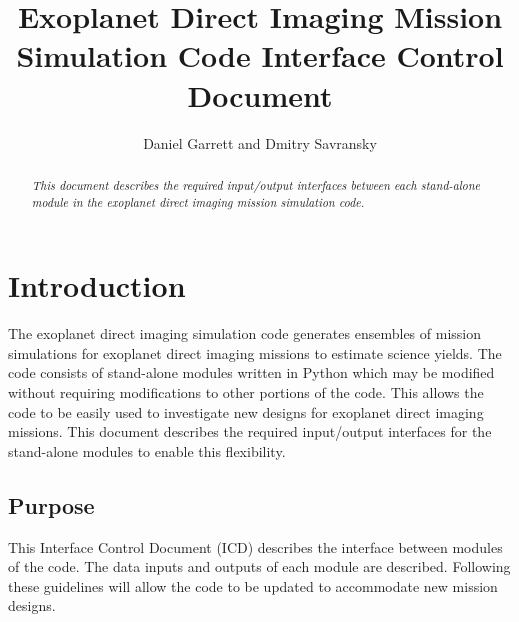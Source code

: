 \documentclass[]{asme2ej}
\title{Exoplanet Direct Imaging Mission Simulation Code Interface Control Document}
\author{Daniel Garrett and Dmitry Savransky
    \affiliation{
	Sibley School of Mechanical and Aerospace Egnineering\\
	Cornell University\\
	Ithaca, NY 14853\\
    }	
}
\begin{document}
\maketitle    

\begin{abstract}
{\it 
This document describes the required input/output interfaces between each stand-alone module in the exoplanet direct imaging mission simulation code.
}
\end{abstract}

\tableofcontents

\begin{nomenclature}
\end{nomenclature}


\section{Introduction}

The exoplanet direct imaging simulation code generates ensembles of mission simulations for exoplanet direct imaging missions to estimate science yields. The code consists of stand-alone modules written in Python which may be modified without requiring modifications to other portions of the code. This allows the code to be easily used to investigate new designs for exoplanet direct imaging missions. This document describes the required input/output interfaces for the stand-alone modules to enable this flexibility.

\subsection{Purpose}
This Interface Control Document (ICD) describes the interface between modules of the code. The data inputs and outputs of each module are described. Following these guidelines will allow the code to be updated to accommodate new mission designs.
\end{document}
